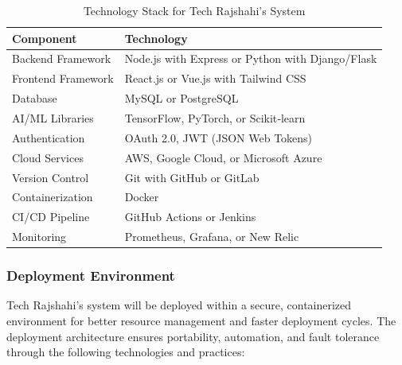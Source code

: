 \documentclass[12pt,a4paper]{article}
\begin{document}
\begin{table}[H]
    \centering
    \renewcommand{\arraystretch}{1.3}
    \begin{tabular}{|p{4cm}|p{10cm}|}
        \hline
        \rowcolor{tableheader}
        \textcolor{headertext}{\textbf{Component}} & \textcolor{headertext}{\textbf{Technology}} \\
        \hline
        Backend Framework & Node.js with Express or Python with Django/Flask \\
        \hline
        Frontend Framework & React.js or Vue.js with Tailwind CSS \\
        \hline
        Database & MySQL or PostgreSQL \\
        \hline
        AI/ML Libraries & TensorFlow, PyTorch, or Scikit‑learn \\
        \hline
        Authentication & OAuth 2.0, JWT (JSON Web Tokens) \\
        \hline
        Cloud Services & AWS, Google Cloud, or Microsoft Azure \\
        \hline
        Version Control & Git with GitHub or GitLab \\
        \hline
        Containerization & Docker \\
        \hline
        CI/CD Pipeline & GitHub Actions or Jenkins \\
        \hline
        Monitoring & Prometheus, Grafana, or New Relic \\
        \hline
    \end{tabular}
    \caption{Technology Stack for Tech Rajshahi's System}
    \label{tab:tech_stack}
\end{table}

\subsubsection{Deployment Environment}
Tech Rajshahi's system will be deployed within a secure, containerized environment for better resource management and faster deployment cycles.  The deployment architecture ensures portability, automation, and fault tolerance through the following technologies and practices:
\end{document}
